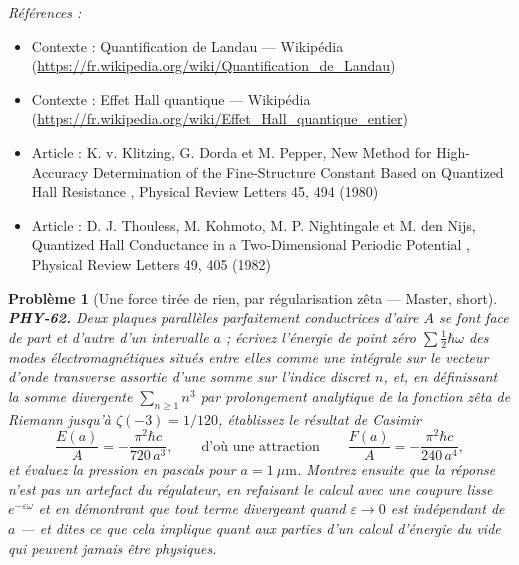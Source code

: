 \documentclass[11pt]{article}
\newtheorem{problem}{Problème}
\newenvironment{refs}{\par\small\noindent\emph{Références :}\begin{itemize}\setlength\itemsep{0pt}}{\end{itemize}\normalsize}
\begin{document}
\begin{refs}
\item Contexte : Quantification de Landau --- Wikipédia (\url{https://fr.wikipedia.org/wiki/Quantification_de_Landau})
\item Contexte : Effet Hall quantique --- Wikipédia (\url{https://fr.wikipedia.org/wiki/Effet_Hall_quantique_entier})
\item Article : K. v. Klitzing, G. Dorda et M. Pepper, \og{} New Method for High-Accuracy Determination of the Fine-Structure Constant Based on Quantized Hall Resistance \fg{}, Physical Review Letters 45, 494 (1980)
\item Article : D. J. Thouless, M. Kohmoto, M. P. Nightingale et M. den Nijs, \og{} Quantized Hall Conductance in a Two-Dimensional Periodic Potential \fg{}, Physical Review Letters 49, 405 (1982)
\end{refs}

\bigskip

\begin{problem}[{Une force tirée de rien, par régularisation zêta --- Master, short}]
\textbf{PHY-62.} Deux plaques parallèles parfaitement conductrices d'aire
$ A $ se font face de part et d'autre d'un intervalle $ a $ ; écrivez l'énergie de point zéro
$ \sum \tfrac{1}{2}\hbar\omega $ des modes électromagnétiques situés entre elles comme une
intégrale sur le vecteur d'onde transverse assortie d'une somme sur l'indice discret $ n $, et,
en définissant la somme divergente $ \sum_{n\ge1} n^{3} $ par prolongement analytique de la
fonction zêta de Riemann jusqu'à $ \zeta(-3) = 1/120 $, établissez le résultat de Casimir
\[ \frac{E(a)}{A} = -\frac{\pi^{2}\hbar c}{720\,a^{3}}, \qquad\text{d'où une attraction}\qquad
\frac{F(a)}{A} = -\frac{\pi^{2}\hbar c}{240\,a^{4}}, \]
et évaluez la pression en pascals pour $ a = 1\ \mu\mathrm{m} $. Montrez ensuite que la réponse
n'est pas un artefact du régulateur, en refaisant le calcul avec une coupure lisse
$ e^{-\varepsilon \omega} $ et en démontrant que tout terme divergeant quand
$ \varepsilon\to0 $ est indépendant de $ a $ --- et dites ce que cela implique quant aux parties
d'un calcul d'énergie du vide qui peuvent jamais être physiques.
\end{problem}
\end{document}
